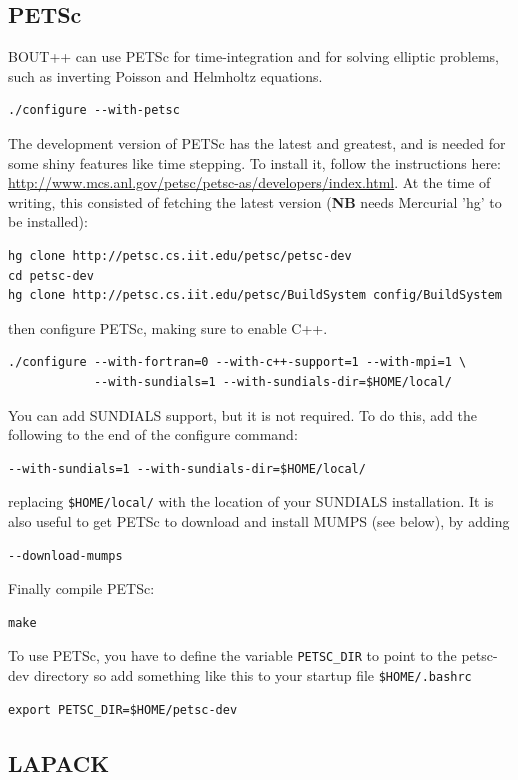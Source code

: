 \documentclass[12pt]{article}
\begin{document}
\subsection{PETSc}

BOUT++ can use PETSc for time-integration and for solving elliptic problems, such as inverting
Poisson and Helmholtz equations.
\begin{verbatim}
./configure --with-petsc
\end{verbatim}

The development version of PETSc has the latest and greatest, and is needed for some
shiny features like time stepping. To install it, follow the instructions here:
\url{http://www.mcs.anl.gov/petsc/petsc-as/developers/index.html}. At the time of
writing, this consisted of fetching the latest version ({\bf NB} needs Mercurial
'hg' to be installed):
\begin{verbatim}
hg clone http://petsc.cs.iit.edu/petsc/petsc-dev
cd petsc-dev
hg clone http://petsc.cs.iit.edu/petsc/BuildSystem config/BuildSystem
\end{verbatim}

then configure PETSc, making sure to enable C++.
\begin{verbatim}
./configure --with-fortran=0 --with-c++-support=1 --with-mpi=1 \
            --with-sundials=1 --with-sundials-dir=$HOME/local/
\end{verbatim}
You can add SUNDIALS support, but it is not required. To do this, add the following
to the end of the configure command:
\begin{verbatim}
--with-sundials=1 --with-sundials-dir=$HOME/local/
\end{verbatim}
replacing \texttt{\$HOME/local/} with the location of your SUNDIALS installation.
It is also useful to get PETSc to download and install MUMPS (see below), by adding
\begin{verbatim}
--download-mumps
\end{verbatim}

Finally compile PETSc:
\begin{verbatim}
make
\end{verbatim}
To use PETSc, you have to define the variable \texttt{PETSC\_DIR} to point to the petsc-dev directory so add something
like this to your startup file \texttt{\$HOME/.bashrc}
\begin{verbatim}
export PETSC_DIR=$HOME/petsc-dev
\end{verbatim}

\subsection{LAPACK}
\end{document}
